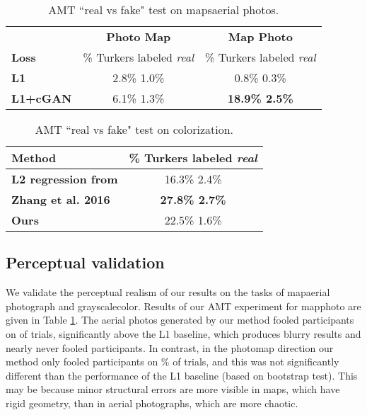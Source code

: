 \documentclass[10pt,twocolumn,letterpaper]{article}
\begin{document}
\begin{table}
\centering
\scalebox{0.75} {
\begin{tabular}{lcc}
 & \textbf{Photo  Map}  &  \textbf{Map  Photo} \\
\textbf{Loss} & \% Turkers labeled \emph{real} & \% Turkers labeled \emph{real} \\
\hline
\textbf{L1} & 2.8\%  1.0\% & 0.8\%  0.3\% \\
\textbf{L1+cGAN} & 6.1\%  1.3\% & {\bf 18.9\%  2.5\%} \\
\end{tabular} }
\vspace{-0.1in}
\caption {AMT ``real vs fake" test on mapsaerial photos.}
\vspace{-0.1in}
\label{tab:AMT_map2sat}
\end{table}


\begin{table}
\centering
\scalebox{0.75} {
\begin{tabular}{lc}
\textbf{Method} & \% Turkers labeled \emph{real} \\
\hline
\textbf{L2 regression from \cite{zhang2016colorful}} & 16.3\%  2.4\% \\
\textbf{Zhang et al. 2016 \cite{zhang2016colorful}} & \textbf{27.8\%  2.7\%} \\
\textbf{Ours} & 22.5\%   1.6\% \\
\end{tabular} }
\vspace{-0.1in}
\caption {AMT ``real vs fake" test on colorization.}
\vspace{-0.1in}
\label{tab:AMT_colorization}
\end{table}



\subsection{Perceptual validation}

We validate the perceptual realism of our results on the tasks of mapaerial photograph and grayscalecolor. Results of our AMT experiment for mapphoto are given in Table \ref{tab:AMT_map2sat}. The aerial photos generated by our method fooled participants on  of trials, significantly above the L1 baseline, which produces blurry results and nearly never fooled participants. In contrast, in the photomap direction our method only fooled participants on \% of trials, and this was not significantly different than the performance of the L1 baseline (based on bootstrap test). This may be because minor structural errors are more visible in maps, which have rigid geometry, than in aerial photographs, which are more chaotic.
\end{document}
